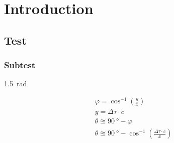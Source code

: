 \chapter{Introduction} \label{ch:introduction}

\section{Test}
\subsection{Subtest}
\SI{1.5}{\radian}

\begin{subequations} \label{eq:tech_ToA}
	\begin{align}
	&\varphi = \cos^{-1} \left( \frac{y}{x} \right) \\
	&y = \Delta \tau \cdot c \\
	&\theta \approxeq \SI{90}{\degree} - \varphi \\
	&\theta \approxeq \SI{90}{\degree} - \cos^{-1} \left( \frac{ \Delta\tau \cdot c}{x} \right)
	\end{align}
\end{subequations}